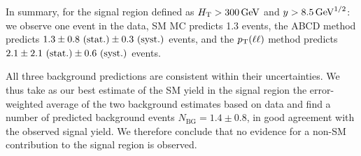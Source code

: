 

In summary, for the signal region defined as $H_{\mathrm{T}}>300\,\text{Ge\hspace{-.08em}V}$ and $y > 8.5\,\text{Ge\hspace{-.08em}V}^{1/2}$: 
we observe one event in the data, 
SM MC predicts 1.3 events, 
the ABCD method predicts $1.3 \pm 0.8~({\rm stat.}) \pm 0.3~({\rm syst.})$ events, 
and the $p_{\mathrm{T}}(\ell\ell)$ method predicts $2.1 \pm 2.1~({\rm stat.}) \pm 0.6~({\rm syst.})$ events.

All three background predictions are consistent within their uncertainties.
We thus take as our best estimate of the SM yield in 
the signal region the error-weighted average of the two background estimates based on data and find 
a number of predicted background events $N_\textrm{BG}=1.4 \pm 0.8$, in good agreement with the 
observed signal yield. We therefore conclude that no evidence for a non-SM contribution 
to the signal region is observed.







